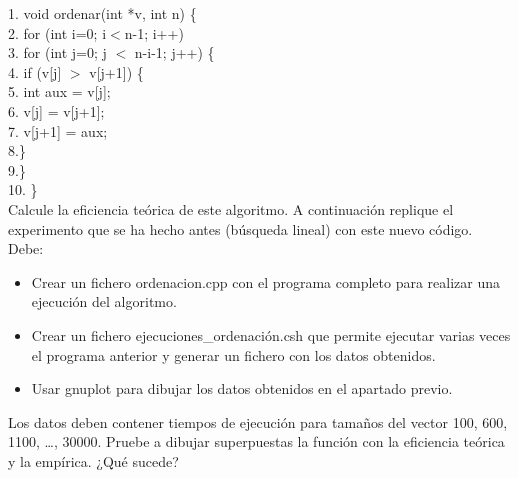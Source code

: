 \documentclass[titlepage, 12pt,a4paper]{article}
\begin{document}
	\hspace*{1cm}1. void ordenar(int *v, int n) \{ \\
	\hspace*{1cm}2.\hspace*{2em}	for (int i=0; i$<$n-1; i++)\\
	\hspace*{1cm}3.\hspace*{4em}		for (int j=0; j $<$ n-i-1; j++) \{ \\
	\hspace*{1cm}4.\hspace*{6em}			if (v[j] $>$ v[j+1]) \{\\
	\hspace*{1cm}5.\hspace*{8em}				int aux = v[j];\\
	\hspace*{1cm}6.\hspace*{8em}				v[j] = v[j+1];\\
	\hspace*{1cm}7.\hspace*{8em}				v[j+1] = aux;\\
	\hspace*{1cm}8.\hspace*{6em}\} \\
	\hspace*{1cm}9.\hspace*{4em}\} \\
	\hspace*{1cm}10. \}  \vspace {1em} \\
Calcule la eficiencia teórica de este algoritmo. A continuación replique el experimento que se ha hecho antes (búsqueda lineal) con este nuevo código. Debe:\\ 
	\begin{itemize}  
	\item Crear un fichero ordenacion.cpp con el programa completo para realizar una
ejecución del algoritmo.
	\item Crear un fichero ejecuciones\_ordenación.csh que permite ejecutar varias veces el programa anterior y generar un fichero con los datos obtenidos. 
	\item Usar gnuplot para dibujar los datos obtenidos en el apartado previo.
	\end{itemize}
Los datos deben contener tiempos de ejecución para tamaños del vector 100, 600, 1100, \ldots,  30000. Pruebe a dibujar superpuestas la función con la eficiencia teórica y la empírica. ¿Qué sucede?\\
\end{document}
